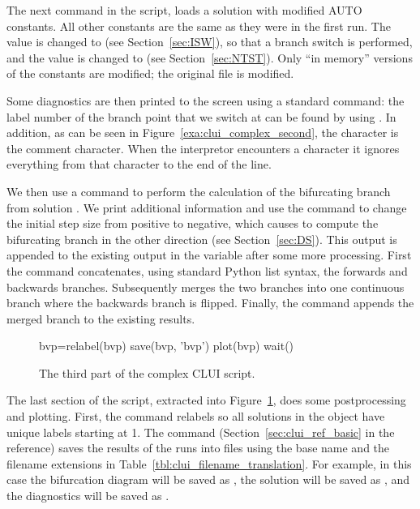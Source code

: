 \documentclass[12pt]{report}
\begin{document}
 The next command in the script,
 loads a solution with modified AUTO constants. All other constants are
 the same as they were in the first run.
 The  value is changed to  (see
 Section~\ref{sec:ISW}), so that a branch switch is performed, and
 the  value is changed to  (see
 Section~\ref{sec:NTST}).
 Only ``in memory'' versions of the \AUTO constants are modified;
 the original file  is  modified.

 Some diagnostics are then printed to the screen using a standard \python
  command: the label number of the branch point that
 we switch at can be found by using .
 In addition, as can be seen in Figure~\ref{exa:clui_complex_second},
 the \commandf{\#} character is the \python comment character.
 When the \python interpretor encounters a \commandf{\#} character
 it ignores everything from that character to the end of the line.

 We then use a  command to perform the
 calculation of the bifurcating branch from solution .
 We print additional information and use the command
   to change the
 \AUTO initial step size from positive to negative, which causes
 \AUTO to compute the bifurcating branch in the other direction
 (see Section~\ref{sec:DS}).
 This output is appended to the existing output in the
 \python variable  after some more processing.
 First the command
  concatenates, using standard Python list
 syntax, the forwards and backwards branches. Subsequently
  merges the two branches into one
 continuous branch where the backwards branch is flipped.
 Finally, the command  appends the
 merged branch to the existing results.

 \begin{figure}[htbp]
 {\small \begin{center} \begin{boxedverbatim}
 bvp=relabel(bvp)
 save(bvp, 'bvp')
 plot(bvp)
 wait()
 \end{boxedverbatim}
 \end{center} 
 }
 \caption[The third part of the  complex \AUTO CLUI script.]
 {The third part of the  complex \AUTO CLUI script.}
 \label{exa:clui_complex_third}
 \end{figure}

 The last section of the script, extracted into 
 Figure~\ref{exa:clui_complex_third}, 
 does some postprocessing and
 plotting. First, the command  relabels
 so all solutions in the  object have unique labels
 starting at 1. The command 
 (Section~\ref{sec:clui_ref_basic} in the reference)
 saves the results of the \AUTO runs into files using
 the base name  and the filename extensions in
 Table~\ref{tbl:clui_filename_translation}.  For example,
 in this case the bifurcation diagram will be saved as , 
 the solution will be saved as , and  
 the diagnostics will be saved as .
\end{document}
